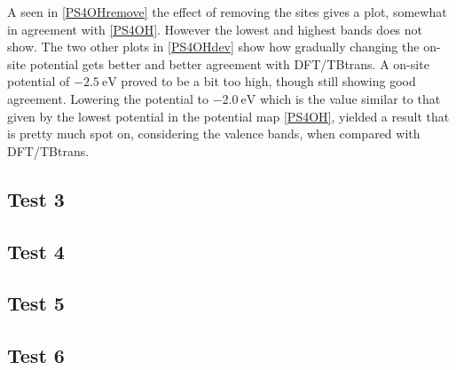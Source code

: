A seen in \cref{PS4OHremove} the effect of removing the sites gives a plot, somewhat in agreement with \cref{PS4OH}. However the lowest and highest bands does not show. The two other plots in \cref{PS4OHdev} show how gradually changing the on-site potential gets better and better agreement with DFT/TBtrans. A on-site potential of \(\SI{-2.5}{\electronvolt}\) proved to be a bit too high, though still showing good agreement. Lowering the potential to \(\SI{-2.0}{\electronvolt}\) which is the value similar to that given by the lowest potential in the potential map \cref{PS4OH}, yielded a result that is pretty much spot on, considering the valence bands, when compared with DFT/TBtrans. 
\subsection{Test 3}
\subsection{Test 4}
\subsection{Test 5}
\subsection{Test 6}

